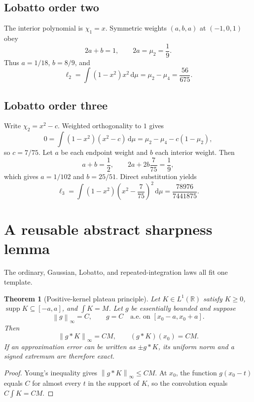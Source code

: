\documentclass[11pt]{article}
\numberwithin{equation}{section}
\newtheorem{theorem}{Theorem}[section]
\theoremstyle{definition}
\theoremstyle{remark}
\DeclareMathOperator{\supp}{supp}
\newcommand{\R}{\mathbb R}
\newcommand{\dd}{\,\mathrm d}
\newcommand{\norm}[1]{\left\lVert#1\right\rVert}
\begin{document}
\subsection{Lobatto order two}

The interior polynomial is $\chi_1=x$.  Symmetric weights $(a,b,a)$ at $(-1,0,1)$ obey
\[
 2a+b=1,
 \qquad
 2a=\mu_2=\frac19.
\]
Thus $a=1/18$, $b=8/9$, and
\[
 \ell_2=\int(1-x^2)x^2\dd\mu
 =\mu_2-\mu_4
 =\frac{56}{675}.
\]

\subsection{Lobatto order three}

Write $\chi_2=x^2-c$.  Weighted orthogonality to $1$ gives
\[
 0=\int(1-x^2)(x^2-c)\dd\mu
 =\mu_2-\mu_4-c(1-\mu_2),
\]
so $c=7/75$.  Let $a$ be each endpoint weight and $b$ each interior weight.  Then
\[
 a+b=\frac12,
 \qquad
 2a+2b\frac7{75}=\frac19,
\]
which gives $a=1/102$ and $b=25/51$.  Direct substitution yields
\[
 \ell_3=\int(1-x^2)\left(x^2-\frac7{75}\right)^2\dd\mu
 =\frac{78976}{7441875}.
\]

\section{A reusable abstract sharpness lemma}
\label{p1:app:abstract-lemma}

The ordinary, Gaussian, Lobatto, and repeated-integration laws all fit one template.

\begin{theorem}[Positive-kernel plateau principle]
\label{p1:thm:abstract-plateau}
Let $K\in L^1(\R)$ satisfy $K\ge0$, $\supp K\subseteq[-a,a]$, and $\int K=M$.  Let $g$ be essentially bounded and suppose
\[
 \norm g_\infty=C,
 \qquad
 g=C\quad\text{a.e. on }[x_0-a,x_0+a].
\]
Then
\begin{equation}
 \norm{g*K}_\infty=CM,
 \qquad
 (g*K)(x_0)=CM.
 \label{p1:eq:abstract-plateau}
\end{equation}
If an approximation error can be written as $\pm g*K$, its uniform norm and a signed extremum are therefore exact.
\end{theorem}

\begin{proof}
Young's inequality gives $\norm{g*K}_\infty\le CM$.  At $x_0$, the function $g(x_0-t)$ equals $C$ for almost every $t$ in the support of $K$, so the convolution equals $C\int K=CM$.
\end{proof}
\end{document}
